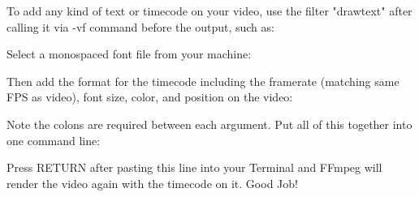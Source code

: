 \begin{fullwidth}

To add any kind of text or timecode on your video, use the filter "drawtext" after calling it via -vf command before the output, such as:


Select a monospaced font file from your machine:


Then add the format for the timecode including the framerate (matching same FPS as video), font size, color, and position on the video:


Note the colons are required between each argument. Put all of this together into one command line:



Press RETURN after pasting this line into your Terminal and FFmpeg will render the video again with the timecode on it. Good Job!


\clearpage

\end{fullwidth}